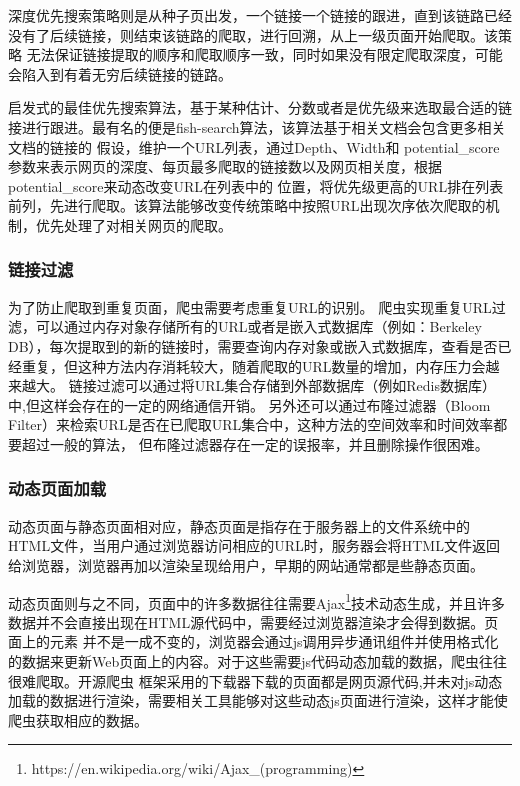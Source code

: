 \documentclass[master]{njuthesis}
\begin{document}
深度优先搜索策略则是从种子页出发，一个链接一个链接的跟进，直到该链路已经没有了后续链接，则结束该链路的爬取，进行回溯，从上一级页面开始爬取。该策略
无法保证链接提取的顺序和爬取顺序一致，同时如果没有限定爬取深度，可能会陷入到有着无穷后续链接的链路。

启发式的最佳优先搜索算法，基于某种估计、分数或者是优先级来选取最合适的链接进行跟进。最有名的便是fish-search算法\cite{de1994searching}，该算法基于相关文档会包含更多相关文档的链接的
假设，维护一个URL列表，通过Depth、Width和 potential\_score参数来表示网页的深度、每页最多爬取的链接数以及网页相关度，根据potential\_score来动态改变URL在列表中的
位置，将优先级更高的URL排在列表前列，先进行爬取。该算法能够改变传统策略中按照URL出现次序依次爬取的机制，优先处理了对相关网页的爬取。

\subsubsection{链接过滤}\label{filter}
为了防止爬取到重复页面，爬虫需要考虑重复URL的识别。
爬虫实现重复URL过滤，可以通过内存对象存储所有的URL或者是嵌入式数据库\cite{singh2014review}（例如：Berkeley DB），每次提取到的新的链接时，需要查询内存对象或嵌入式数据库，查看是否已经重复，但这种方法内存消耗较大，随着爬取的URL数量的增加，内存压力会越来越大。
链接过滤可以通过将URL集合存储到外部数据库（例如Redis数据库）中,但这样会存在的一定的网络通信开销。
另外还可以通过布隆过滤器\cite{christensen2010new}（Bloom Filter）来检索URL是否在已爬取URL集合中，这种方法的空间效率和时间效率都要超过一般的算法，
但布隆过滤器存在一定的误报率，并且删除操作很困难。


\subsubsection{动态页面加载}\label{sec:page-load}
动态页面与静态页面相对应\cite{hand2014data}，静态页面是指存在于服务器上的文件系统中的HTML文件，当用户通过浏览器访问相应的URL时，服务器会将HTML文件返回
给浏览器，浏览器再加以渲染呈现给用户，早期的网站通常都是些静态页面。

动态页面则与之不同，页面中的许多数据往往需要Ajax\footnote{https://en.wikipedia.org/wiki/Ajax\_(programming)}技术动态生成，并且许多数据并不会直接出现在HTML源代码中，需要经过浏览器渲染才会得到数据。页面上的元素
并不是一成不变的，浏览器会通过js调用异步通讯组件并使用格式化的数据来更新Web页面上的内容。对于这些需要js代码动态加载的数据，爬虫往往很难爬取。开源爬虫
框架采用的下载器下载的页面都是网页源代码,并未对js动态加载的数据进行渲染，需要相关工具能够对这些动态js页面进行渲染，这样才能使爬虫获取相应的数据。
\end{document}
